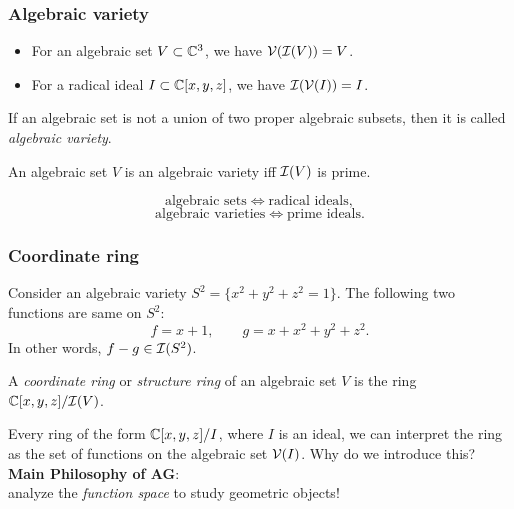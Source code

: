 \documentclass[10pt]{beamer}
\begin{document}
\begin{frame}
\frametitle{Algebraic variety}
  \begin{prop}\begin{itemize}
    \item For an algebraic set $V\subset\mathbb{C}^3$, we have $\mathcal{V}(\mathcal{I}(V))=V$.
    \item For a radical ideal $I\subset\mathbb{C}[x,y,z]$, we have $\mathcal{I}(\mathcal{V}(I))=I$.
  \end{itemize}\end{prop}
  \pause
  \begin{defn}
    If an algebraic set is not a union of two proper algebraic subsets, then it is called \emph{algebraic variety}.
  \end{defn}
  \begin{prop}
    An algebraic set $V$ is an algebraic variety iff $\mathcal{I}(V)$ is prime.
  \end{prop}
  \pause
  \[\text{algebraic sets}\iff\text{radical ideals},\]\vspace{-1em}
  \[\text{algebraic varieties}\iff\text{prime ideals}.\]
\end{frame}

\begin{frame}
\frametitle{Coordinate ring}
  Consider an algebraic variety $S^2=\{x^2+y^2+z^2=1\}$.
  The following two functions are same on $S^2$:
  \[f=x+1,\qquad g=x+x^2+y^2+z^2.\]
  In other words, $f-g\in\mathcal{I}(S^2)$.
  \pause
  \begin{defn}
    A \emph{coordinate ring} or \emph{structure ring} of an algebraic set $V$ is the ring $\mathbb{C}[x,y,z]/\mathcal{I}(V)$.
  \end{defn}
  \bigskip
  Every ring of the form $\mathbb{C}[x,y,z]/I$, where $I$ is an ideal, we can interpret the ring as the set of functions on the algebraic set $\mathcal{V}(I)$.
  Why do we introduce this?\\
  \smallskip
  \pause \textbf{Main Philosophy of AG}:\\
  \qquad\qquad analyze the \emph{function space} to study geometric objects!
\end{frame}
\end{document}
